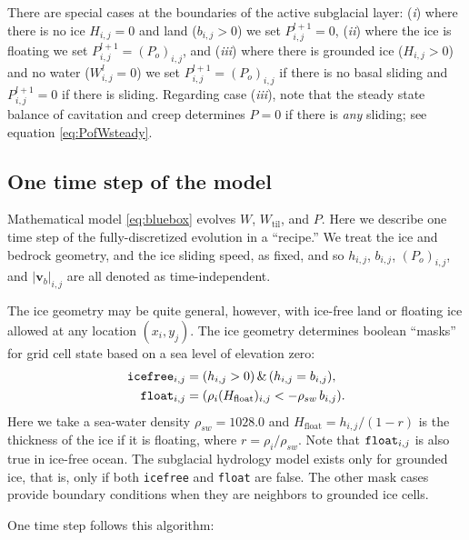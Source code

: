 \documentclass[gmd]{copernicus}   %
\newcommand{\text}{\textrm}
\newcommand\bv{\mathbf{v}}
\newcommand{\Wtil}{W_{\text{til}}}
\begin{document}
There are special cases at the boundaries of the active subglacial layer: (\emph{i}) where there is no ice $H_{i,j}=0$ and land ($b_{i,j}>0$) we set $P_{i,j}^{l+1}=0$, (\emph{ii}) where the ice is floating we set $P_{i,j}^{l+1}=(P_o)_{i,j}$, and (\emph{iii}) where there is grounded ice ($H_{i,j}>0$) and no water ($W_{i,j}^l=0$) we set $P_{i,j}^{l+1}=(P_o)_{i,j}$ if there is no basal sliding and $P_{i,j}^{l+1}=0$ if there is sliding.  Regarding case (\emph{iii}), note that the steady state balance of cavitation and creep determines $P=0$ if there is \emph{any} sliding; see equation \eqref{eq:PofWsteady}.

\subsection{One time step of the model}  Mathematical model \eqref{eq:bluebox} evolves $W$, $\Wtil$, and $P$.  Here we describe one time step of the fully-discretized evolution in a ``recipe.''  We treat the ice and bedrock geometry, and the ice sliding speed, as fixed, and so $h_{i,j}$, $b_{i,j}$, $(P_o)_{i,j}$, and $|\bv_b|_{i,j}$ are all denoted as time-independent.

The ice geometry may be quite general, however, with ice-free land or floating ice allowed at any location $(x_i,y_j)$.  The ice geometry determines boolean ``masks'' for grid cell state based on a sea level of elevation zero:
\begin{align*}
\text{\texttt{icefree}}_{i,j} &= (h_{i,j} > 0)\, \&\, (h_{i,j} = b_{i,j}), \\
\text{\texttt{float}}_{i,j}   &= (\rho_i (H_{\text{float}})_{i,j} < - \rho_{sw}\, b_{i,j}).
\end{align*}
Here we take a sea-water density $\rho_{sw}=1028.0$ and $H_{\text{float}}=h_{i,j} / (1 - r)$  is the thickness of the ice if it is floating, where $r=\rho_i / \rho_{sw}$.  Note that $\text{\texttt{float}}_{i,j}$ is also true in ice-free ocean.  The subglacial hydrology model exists only for grounded ice, that is, only if both \texttt{icefree} and \texttt{float} are false.  The other mask cases provide boundary conditions when they are neighbors to grounded ice cells.

One time step follows this algorithm:
\end{document}
